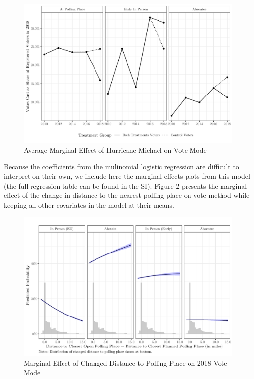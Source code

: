 \documentclass[
  12pt,
]{article}
\begin{document}
\begin{figure}[h]

{\centering \includegraphics{hurricane_michael_files/figure-latex/vote-mode-chunk-1} 

}

\caption{\label{fig:vote-mode}Average Marginal Effect of Hurricane Michael on Vote Mode}\label{fig:vote-mode-chunk}
\end{figure}

Because the coefficients from the mulinomial logistic regression are difficult to interpret on their own, we include here the marginal effects plots from this model (the full regression table can be found in the SI). Figure \ref{fig:marg-multi} presents the marginal effect of the change in distance to the nearest polling place on vote method while keeping all other covariates in the model at their means.

\begin{figure}[h]

{\centering \includegraphics{hurricane_michael_files/figure-latex/marg-multi-1} 

}

\caption{\label{fig:marg-multi}Marginal Effect of Changed Distance to Polling Place on 2018 Vote Mode}\label{fig:marg-multi}
\end{figure}
\end{document}
